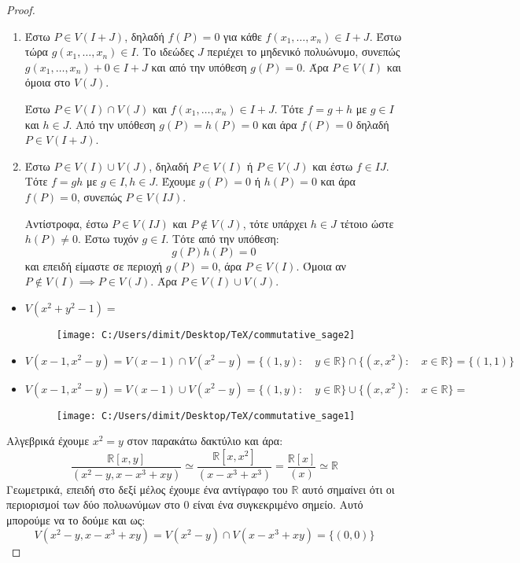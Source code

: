 \documentclass[oneside,a4paper]{article}
\begin{document}
\begin{proof}
	$ $\newline
	\begin{enumerate}
		\item Έστω $P \in V(I+J)$, δηλαδή $f(P) = 0$ για κάθε $f(x_1,\ldots, x_n) \in I+J$. Έστω τώρα $g(x_1,\ldots,x_n) \in I$. Το ιδεώδες $J$ περιέχει το μηδενικό πολυώνυμο, συνεπώς $g(x_1,\ldots, x_n) + 0 \in I+J$ και από την υπόθεση $g(P) = 0$. Άρα $P \in V(I)$ και όμοια στο $V(J)$.
		
		$ $\newline Έστω $P \in V(I)\cap V(J)$ και $f(x_1, \ldots, x_n) \in I+J$. Τότε $f = g + h$ με $g \in I$ και $h \in J$. Από την υπόθεση $g(P)=h(P) = 0$ και άρα $f(P) = 0$ δηλαδή $P \in V(I+J)$.

		\item Έστω $P \in V(I)\cup V(J)$, δηλαδή $P \in V(I)$ ή $P \in V(J)$ και έστω $f \in IJ$. Τότε $f=gh$ με $g \in I, h \in J$. Έχουμε $g(P) = 0$ ή $h(P) = 0$ και άρα $f(P) = 0$, συνεπώς $P \in V(IJ)$.
		
		$ $\newline Αντίστροφα, έστω $P \in V(IJ)$ και $P \not\in V(J)$, τότε υπάρχει $h \in J$ τέτοιο ώστε $h(P) \neq 0$. Έστω τυχόν $g \in I$. Τότε από την υπόθεση:
		$$g(P)h(P) = 0$$
		και επειδή είμαστε σε περιοχή $g(P) = 0$, άρα $P \in V(I)$. Όμοια αν $P \not\in V(I) \implies P \in V(J)$. Άρα $P \in V(I)\cup V(J)$.
	\end{enumerate}

	\pagebreak

	\begin{itemize}
		\item $V(x^2 + y^2 -1 ) = $
		\begin{figure}[ht]
		\centering
		\texttt{[image: C:/Users/dimit/Desktop/TeX/commutative\_sage2]}
		\end{figure}
		
		\item $V(x-1,x^2 -y) = V(x-1)\cap V(x^2 - y) = \{(1,y): \quad y \in \mathbb{R}\} \cap \{ (x,x^2): \quad x \in \mathbb{R}\} = \{(1,1)\}$
		\item $V(x-1,x^2-y) = V(x-1)\cup V(x^2 - y) = \{(1,y): \quad y \in \mathbb{R}\} \cup \{ (x,x^2): \quad x \in \mathbb{R}\} = $
		
		\begin{figure}[h]
			\centering
			\texttt{[image: C:/Users/dimit/Desktop/TeX/commutative\_sage1]}
			\end{figure}
	\end{itemize}
Αλγεβρικά έχουμε $x^2 = y$ στον παρακάτω δακτύλιο και άρα:
$$\frac{\mathbb{R}[x,y]}{(x^2-y,x-x^3+xy)} \simeq \frac{\mathbb{R}[x,x^2]}{(x-x^3+x^3)} = \frac{\mathbb{R}[x]}{(x)} \simeq \mathbb{R}$$
Γεωμετρικά, επειδή στο δεξί μέλος έχουμε ένα αντίγραφο του $\mathbb{R}$ αυτό σημαίνει ότι οι περιορισμοί των δύο πολυωνύμων στο 0 είναι ένα συγκεκριμένο σημείο. Αυτό μπορούμε να το δούμε και ως:
$$V(x^2-y,x-x^3+xy) = V(x^2-y)\cap V(x-x^3 + xy) = \{(0,0)\}$$

\end{proof}
\end{document}
